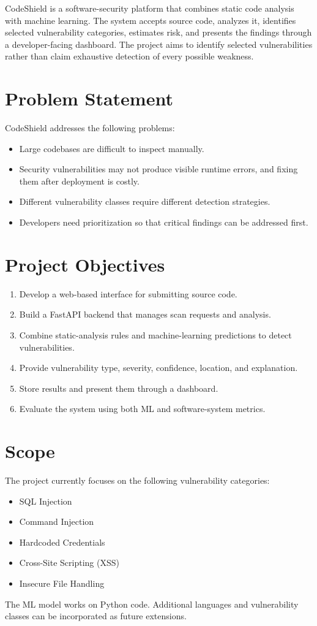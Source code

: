 \documentclass[12pt,a4paper]{report}
\begin{document}
CodeShield is a software-security platform that combines static code analysis with machine learning. The system accepts source code, analyzes it, identifies selected vulnerability categories, estimates risk, and presents the findings through a developer-facing dashboard. The project aims to identify selected vulnerabilities rather than claim exhaustive detection of every possible weakness.

\section{Problem Statement}
CodeShield addresses the following problems:
\begin{itemize}[noitemsep]
  \item Large codebases are difficult to inspect manually.
  \item Security vulnerabilities may not produce visible runtime errors, and fixing them after deployment is costly.
  \item Different vulnerability classes require different detection strategies.
  \item Developers need prioritization so that critical findings can be addressed first.
\end{itemize}

\section{Project Objectives}
\begin{enumerate}[noitemsep]
  \item Develop a web-based interface for submitting source code.
  \item Build a FastAPI backend that manages scan requests and analysis.
  \item Combine static-analysis rules and machine-learning predictions to detect vulnerabilities.
  \item Provide vulnerability type, severity, confidence, location, and explanation.
  \item Store results and present them through a dashboard.
  \item Evaluate the system using both ML and software-system metrics.
\end{enumerate}

\section{Scope}
The project currently focuses on the following vulnerability categories:
\begin{itemize}[noitemsep]
  \item SQL Injection
  \item Command Injection
  \item Hardcoded Credentials
  \item Cross-Site Scripting (XSS)
  \item Insecure File Handling
\end{itemize}
The ML model works on Python code. Additional languages and vulnerability classes can be incorporated as future extensions.
\end{document}
